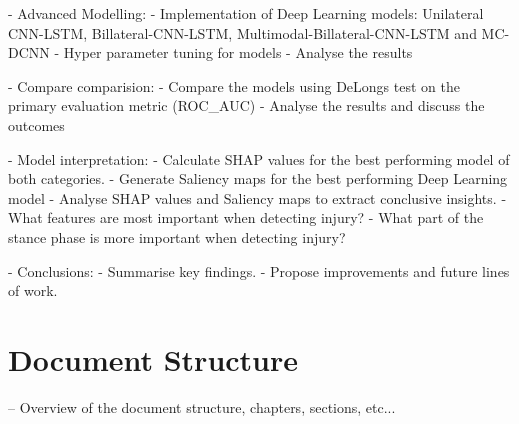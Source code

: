 - Advanced Modelling:
    - Implementation of Deep Learning models: Unilateral CNN-LSTM, Billateral-CNN-LSTM, Multimodal-Billateral-CNN-LSTM and MC-DCNN
    - Hyper parameter tuning for models
    - Analyse the results

- Compare comparision:
    - Compare the models using DeLongs test on the primary evaluation metric (ROC_AUC)
    - Analyse the results and discuss the outcomes

- Model interpretation:
    - Calculate SHAP values for the best performing model of both categories.
    - Generate Saliency maps for the best performing Deep Learning model
    - Analyse SHAP values and Saliency maps to extract conclusive insights.
        - What features are most important when detecting injury?
        - What part of the stance phase is more important when detecting injury?

- Conclusions:
    - Summarise key findings.
    - Propose improvements and future lines of work.

\section{Document Structure}\label{sec:intro-structure}
-- Overview of the document structure, chapters, sections, etc...


